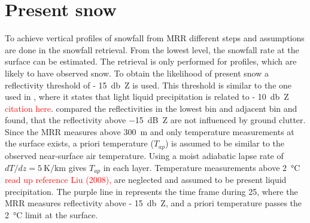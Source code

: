 \section{Present snow}\label{sec:pre_snow}

To achieve vertical profiles of snowfall from MRR different steps and assumptions are done in the snowfall retrieval. From the lowest level, the snowfall rate at the surface can be estimated. The retrieval is only performed for profiles, which are likely to have observed snow. To obtain the likelihood of present snow a reflectivity threshold of \SI{- 15}{\decibel Z} is used. This threshold is similar to the one used in \cite{wood_level_2013}, where it states that light liquid precipitation is related to \SI{- 10}{\decibel Z} \textcolor{red}{citation here}. \cite{wood_estimation_2011} compared the reflectivities in the lowest bin and adjacent bin and found, that the reflectivity above \SI{-15}{\dB Z} are not influenced by ground clutter.
\newline
Since the MRR measures above \SI{300}{\metre} and only temperature measurements at the surface exists, a priori temperature ($T_{ap}$) is assumed to be similar to the observed near-surface air temperature. Using a moist adiabatic lapse rate of $dT/dz = \SI{5}{\kelvin\per\km}$ gives $T_{ap}$ in each layer. Temperature measurements above \SI{2}{\celsius} \textcolor{red}{read up reference Liu (2008), \cite{wood_level_2013}} are neglected and assumed to be present liquid precipitation. 
The purple line in  represents the time frame during \SI{25}{\dec}, where the MRR measures reflectivity above \SI{- 15}{\decibel Z}, and a priori temperature passes the \SI{2}{\celsius} limit at the surface.  



